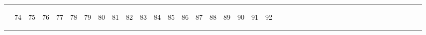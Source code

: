 \begin{tabular}{lp{1pt}p{1pt}p{1pt}p{1pt}p{1pt}p{1pt}p{1pt}p{1pt}p{1pt}p{1pt}p{1pt}p{1pt}p{1pt}p{1pt}p{1pt}p{1pt}p{1pt}p{1pt}p{1pt}p{1pt}p{1pt}p{1pt}p{1pt}p{1pt}p{1pt}p{1pt}p{1pt}p{1pt}p{1pt}p{1pt}p{1pt}p{1pt}p{1pt}p{1pt}p{1pt}p{1pt}p{1pt}p{1pt}p{1pt}|p{1pt}}
& \begin{sideways}74\end{sideways} & \begin{sideways}75\end{sideways} & \begin{sideways}76\end{sideways} & \begin{sideways}77\end{sideways} & \begin{sideways}78\end{sideways} & \begin{sideways}79\end{sideways} & \begin{sideways}80\end{sideways} & \begin{sideways}81\end{sideways} & \begin{sideways}82\end{sideways} & \begin{sideways}83\end{sideways} & \begin{sideways}84\end{sideways} & \begin{sideways}85\end{sideways} & \begin{sideways}86\end{sideways} & \begin{sideways}87\end{sideways} & \begin{sideways}88\end{sideways} & \begin{sideways}89\end{sideways} & \begin{sideways}90\end{sideways} & \begin{sideways}91\end{sideways} & \begin{sideways}92\end{sideways} & 
\end{tabular}
